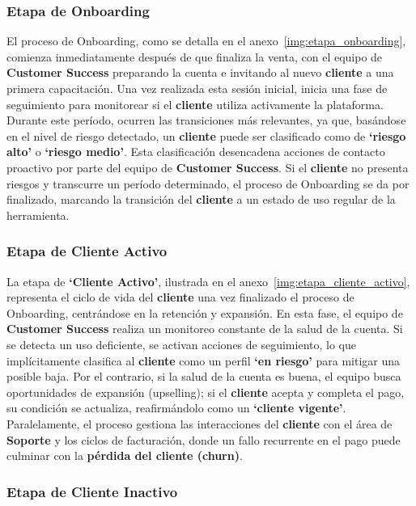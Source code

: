 \subsubsection{Etapa de Onboarding}

El proceso de Onboarding, como se detalla en el anexo~\ref{img:etapa_onboarding}, comienza inmediatamente después de que finaliza la venta, con el equipo de \textbf{Customer Success} preparando la cuenta e invitando al nuevo \textbf{cliente} a una primera capacitación. Una vez realizada esta sesión inicial, inicia una fase de seguimiento para monitorear si el \textbf{cliente} utiliza activamente la plataforma. Durante este período, ocurren las transiciones más relevantes, ya que, basándose en el nivel de riesgo detectado, un \textbf{cliente} puede ser clasificado como de \textbf{`riesgo alto'} o \textbf{`riesgo medio'}. Esta clasificación desencadena acciones de contacto proactivo por parte del equipo de \textbf{Customer Success}. Si el \textbf{cliente} no presenta riesgos y transcurre un período determinado, el proceso de Onboarding se da por finalizado, marcando la transición del \textbf{cliente} a un estado de uso regular de la herramienta.

\subsubsection{Etapa de Cliente Activo}

La etapa de \textbf{`Cliente Activo'}, ilustrada en el anexo~\ref{img:etapa_cliente_activo}, representa el ciclo de vida del \textbf{cliente} una vez finalizado el proceso de Onboarding, centrándose en la retención y expansión. En esta fase, el equipo de \textbf{Customer Success} realiza un monitoreo constante de la salud de la cuenta. Si se detecta un uso deficiente, se activan acciones de seguimiento, lo que implícitamente clasifica al \textbf{cliente} como un perfil \textbf{`en riesgo'} para mitigar una posible baja. Por el contrario, si la salud de la cuenta es buena, el equipo busca oportunidades de expansión (upselling); si el \textbf{cliente} acepta y completa el pago, su condición se actualiza, reafirmándolo como un \textbf{`cliente vigente'}. Paralelamente, el proceso gestiona las interacciones del \textbf{cliente} con el área de \textbf{Soporte} y los ciclos de facturación, donde un fallo recurrente en el pago puede culminar con la \textbf{pérdida del cliente (churn)}.

\subsubsection{Etapa de Cliente Inactivo}

